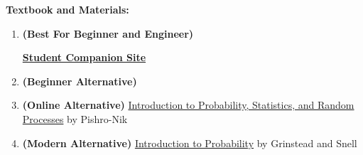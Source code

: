 \documentclass{article}
\begin{document}
\textbf{Textbook and Materials:} {
    \begin{enumerate}
        \item \textbf{(Best For Beginner and Engineer)} 

        \href{https://bcs.wiley.com/he-bcs/Books?action=index&itemId=1118324560&bcsId=8677}{\textbf{Student Companion Site}}
        \item \textbf{(Beginner Alternative)} 
        \item \textbf{(Online Alternative)} \href{https://www.probabilitycourse.com/}{Introduction to Probability, Statistics, and Random Processes} by Pishro-Nik
        \item \textbf{(Modern Alternative)} \href{https://www.stat.berkeley.edu/~aldous/134/grinstead.pdf}{Introduction to Probability} by Grinstead and Snell
    \end{enumerate}
}
\end{document}
